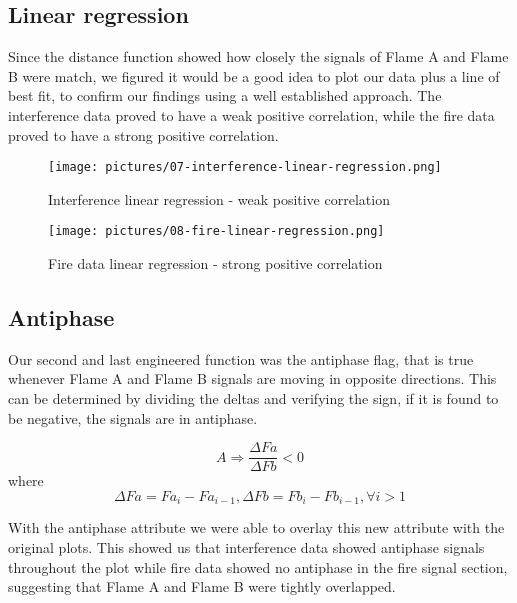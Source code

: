 \subsection{Linear regression}

Since the distance function showed how closely the signals of Flame A and Flame B were match, we figured it would be a good idea to plot our data plus a line of best fit, to confirm our findings using a well established approach.  
The interference data proved to have a weak positive correlation, while the fire data proved to have a strong positive correlation.

\begin{figure}[tb]
 \centering %
 \texttt{[image: pictures/07-interference-linear-regression.png]}
 \caption{Interference linear regression - weak positive correlation}
 \label{fig:sample}
\end{figure}

\begin{figure}[tb]
 \centering %
 \texttt{[image: pictures/08-fire-linear-regression.png]}
 \caption{Fire data linear regression - strong positive correlation}
 \label{fig:sample}
\end{figure}

\subsection{Antiphase}

Our second and last engineered function was the antiphase flag, that is true whenever Flame A and Flame B signals are moving in opposite directions. This can be determined by dividing the deltas and verifying the sign, if it is found to be negative, the signals are in antiphase.

$$  A \Rightarrow \frac{\Delta Fa}{\Delta Fb}<0$$
where
$$ \Delta Fa = Fa{_i}-Fa{_{i-1}}, \Delta Fb = Fb{_i}-Fb{_{i-1}}, \forall i > 1 $$

With the antiphase attribute we were able to overlay this new attribute with the original plots. This showed us that interference data showed antiphase signals throughout the plot while fire data showed no antiphase in the fire signal section, suggesting that Flame A and Flame B were tightly overlapped.

